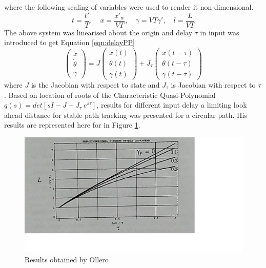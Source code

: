 where the following scaling of variables were used to render it non-dimensional. 
\begin{equation*}
t=\frac{t'}{T}, \quad x=\frac{x'_w}{VT}, \quad \gamma=VT\gamma',\quad l=\frac{L}{VT}
\end{equation*}
The above system was linearised about the origin and  delay $\tau$ in  input was introduced  to get Equation \ref{eqn:delayPP}
\begin{equation}
\label{eqn:delayPP}
\begin{pmatrix}
\dot{x}\\\dot{\theta}\\\dot{\gamma}
\end{pmatrix}
=J
\begin{pmatrix}
x(t)\\\theta(t)\\\gamma(t)
\end{pmatrix}+
J_\tau 
\begin{pmatrix}
x(t-\tau)\\\theta(t-\tau)\\\gamma(t-\tau)
\end{pmatrix}
\end{equation}
where $J$ is the Jacobian with respect to state and $J_\tau$ is Jacobian with respect to $\tau$. 
Based on location of roots of the Characteristic Quasi-Polynomial $q(s)=det[sI-J-J_\tau~ e^{s\tau} ] $, results for different input delay a limiting  look ahead distance for stable path tracking was presented for a  circular path. His results are represented here for  in Figure \ref{fig:resultsPP}.
  \begin{figure}[h]
  	\centering
	\includegraphics[width=.7\linewidth]{Chapter7/fig/resultsPP}
	\caption{Results obtained by Ollero \cite{ollero1995stability} }
	\label{fig:resultsPP}
\end{figure}